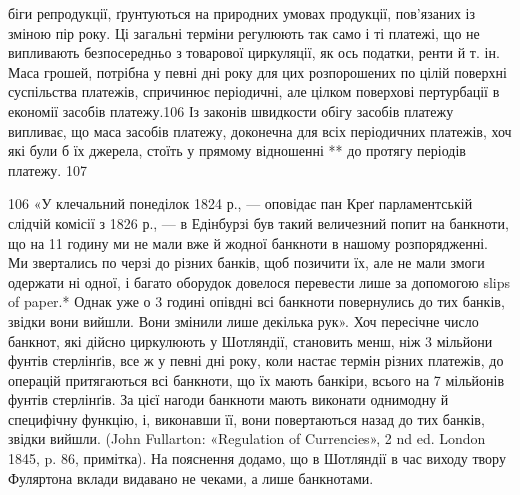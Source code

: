 біги репродукції, ґрунтуються на природних умовах продукції,
пов’язаних із зміною пір року. Ці загальні терміни регулюють
так само і ті платежі, що не випливають безпосередньо з товарової
циркуляції, як ось податки, ренти й т. ін. Маса грошей, потрібна
у певні дні року для цих розпорошених по цілій поверхні суспільства
платежів, спричинює періодичні, але цілком поверхові пертурбації
в економії засобів платежу.106 Із законів швидкости
обігу засобів платежу випливає, що маса засобів платежу, доконечна
для всіх періодичних платежів, хоч які були б їх джерела,
стоїть у прямому відношенні ** до протягу періодів платежу. 107

106 «У клечальний понеділок 1824 р., — оповідає пан Креґ парламентській
слідчій комісії з 1826 р., — в Едінбурзі був такий величезний попит
на банкноти, що на 11 годину ми не мали вже й жодної банкноти в нашому
розпорядженні. Ми звертались по черзі до різних банків, щоб позичити
їх, але не мали змоги одержати ні одної, і багато оборудок довелося перевести
лише за допомогою slips of paper.* Однак уже о 3 годині опівдні
всі банкноти повернулись до тих банків, звідки вони вийшли. Вони змінили
лише декілька рук». Хоч пересічне число банкнот, які дійсно циркулюють
у Шотляндії, становить менш, ніж 3 мільйони фунтів стерлінґів,
все ж у певні дні року, коли настає термін різних платежів, до операцій
притягаються всі банкноти, що їх мають банкіри, всього на 7 мільйонів
фунтів стерлінґів. За цієї нагоди банкноти мають виконати однимодну
й специфічну функцію, і, виконавши її, вони повертаються назад
до тих банків, звідки вийшли. (John Fullarton: «Regulation of Currencies»,
2 nd ed. London 1845, p. 86, примітка). На пояснення додамо, що в Шотляндії
в час виходу твору Фуляртона вклади видавано не чеками, а лише
банкнотами.

